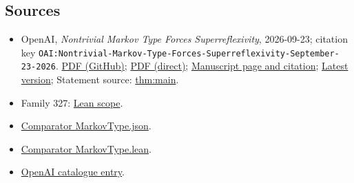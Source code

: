 \documentclass[11pt]{article}
\begin{document}
\subsection{Sources}
\begin{itemize}
\item OpenAI, \emph{Nontrivial Markov Type Forces Superreflexivity}, 2026-09-23; citation key \texttt{OAI:Nontrivial-Markov-Type-Forces-Superreflexivity-September-23-2026}. \href{https://github.com/openai/math/blob/adc7f1241b42e322a6451854ab7e4b4c146bf78a/preprints/Nontrivial-Markov-Type-Forces-Superreflexivity-September-23-2026/paper.pdf}{PDF (GitHub)}; \href{https://github.com/openai/math/raw/adc7f1241b42e322a6451854ab7e4b4c146bf78a/preprints/Nontrivial-Markov-Type-Forces-Superreflexivity-September-23-2026/paper.pdf}{PDF (direct)}; \href{https://github.com/openai/math/blob/adc7f1241b42e322a6451854ab7e4b4c146bf78a/preprints/Nontrivial-Markov-Type-Forces-Superreflexivity-September-23-2026/README.md}{Manuscript page and citation}; \href{https://github.com/openai/math/blob/main/preprints/Nontrivial-Markov-Type-Forces-Superreflexivity-September-23-2026/paper.pdf}{Latest version}; Statement source: \href{https://github.com/openai/math/blob/adc7f1241b42e322a6451854ab7e4b4c146bf78a/preprints/Nontrivial-Markov-Type-Forces-Superreflexivity-September-23-2026/build/main.tex\#L90}{thm:main}.
\item Family 327: \href{https://github.com/openai/math/blob/adc7f1241b42e322a6451854ab7e4b4c146bf78a/lean/docs/327.md}{Lean scope}.
\item \href{https://github.com/openai/math/blob/adc7f1241b42e322a6451854ab7e4b4c146bf78a/lean/ComparatorChallenges/MarkovType.json}{Comparator MarkovType.json}.
\item \href{https://github.com/openai/math/blob/adc7f1241b42e322a6451854ab7e4b4c146bf78a/lean/ComparatorChallenges/MarkovType.lean}{Comparator MarkovType.lean}.
\item \href{https://github.com/openai/math/blob/adc7f1241b42e322a6451854ab7e4b4c146bf78a/CONTENTS.md}{OpenAI catalogue entry}.
\end{itemize}
\end{document}
